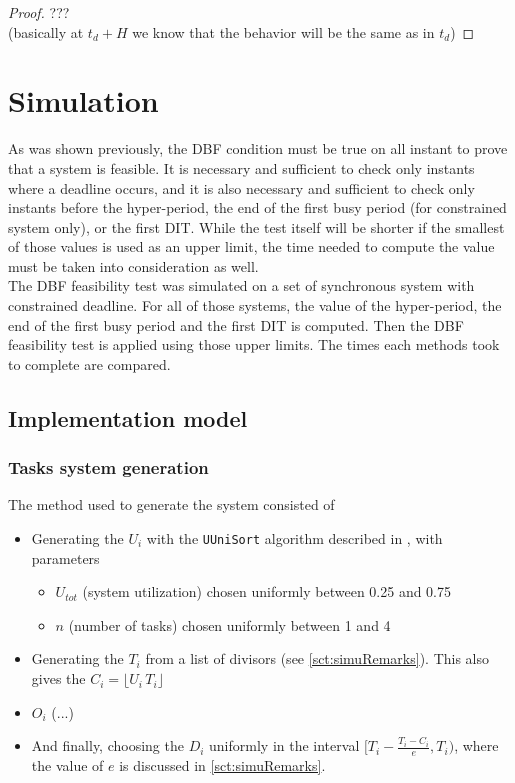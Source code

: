 \documentclass[a4paper,10pt]{article}
\begin{document}
\begin{proof}
???\\

(basically at $t_d + H$ we know that the behavior will be the same as in $t_d$)
\end{proof}

\section{Simulation}

As was shown previously, the DBF condition must be true on all instant to prove that a system is feasible. It is necessary and sufficient to check only instants where a deadline occurs, and it is also necessary and sufficient to check only instants before the hyper-period, the end of the first busy period (for constrained system only), or the first DIT. While the test itself will be shorter if the smallest of those values is used as an upper limit, the time needed to compute the value must be taken into consideration as well.\\

The DBF feasibility test was simulated on a set of synchronous system with constrained deadline. For all of those systems, the value of the hyper-period, the end of the first busy period and the first DIT is computed. Then the DBF feasibility test is applied using those upper limits. The times each methods took to complete are compared.

\subsection{Implementation model}

\subsubsection{Tasks system generation}

The method used to generate the system consisted of
\begin{itemize}
	\item Generating the $U_i$ with the \texttt{UUniSort} algorithm described in \cite{bini2005measuring}, with parameters
	\begin{itemize}
		\item $U_{tot}$ (system utilization) chosen uniformly between 0.25 and 0.75
		\item $n$ (number of tasks) chosen uniformly between 1 and 4
	\end{itemize}
	\item Generating the $T_i$ from a list of divisors (see \ref{sct:simuRemarks}). This also gives the $C_i = \lfloor U_i \, T_i \rfloor$
	\item $O_i$ (...)
	\item And finally, choosing the $D_i$ uniformly in the interval $[T_i - \frac{T_i - C_i}{e}, T_i)$, where the value of $e$ is discussed in \ref{sct:simuRemarks}.
\end{itemize}
\end{document}
